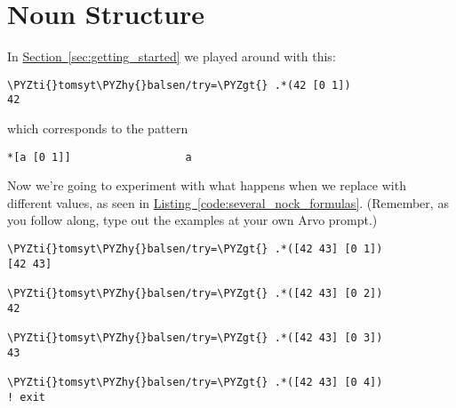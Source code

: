\section{Noun Structure}

\label{sec:noun_structure}

In \hyperref[sec:getting_started]{Section~\ref{sec:getting_started}} we played around with this:

\begin{framed_shaded}
\begin{Verbatim}[fontsize=\relsize{-2.5},commandchars=\\\{\}]
\PYZti{}tomsyt\PYZhy{}balsen/try=\PYZgt{} .*(42 [0 1])
42
\end{Verbatim}
\end{framed_shaded}
which corresponds to the pattern
\begin{framed_shaded}
\begin{Verbatim}[fontsize=\relsize{-2.5},commandchars=\\\{\}]
*[a [0 1]]                  a
\end{Verbatim}
\end{framed_shaded}

Now we're going to experiment with what happens when we replace  with
different values, as seen in \hyperref[code:several_nock_formulas]{Listing~\ref{code:several_nock_formulas}}. (Remember, as you follow along, type out the examples at your own Arvo prompt.)

\begin{codelisting}
\label{code:several_nock_formulas}
\begin{Verbatim}[fontsize=\relsize{-2.5},commandchars=\\\{\}]
\PYZti{}tomsyt\PYZhy{}balsen/try=\PYZgt{} .*([42 43] [0 1])
[42 43]

\PYZti{}tomsyt\PYZhy{}balsen/try=\PYZgt{} .*([42 43] [0 2])
42

\PYZti{}tomsyt\PYZhy{}balsen/try=\PYZgt{} .*([42 43] [0 3])
43

\PYZti{}tomsyt\PYZhy{}balsen/try=\PYZgt{} .*([42 43] [0 4])
! exit
\end{Verbatim}
\end{codelisting}

